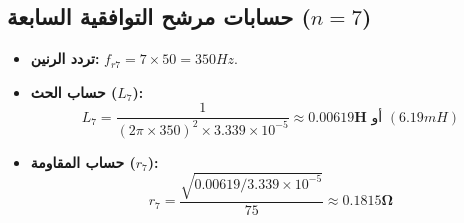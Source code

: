 
\subsection{حسابات مرشح التوافقية السابعة ($n=7$)}
\begin{itemize}
    \item \textbf{تردد الرنين:} $f_{r7} = 7 \times 50 = 350 Hz$.
    \item \textbf{حساب الحث ($L_7$):}
    \begin{equation*}
        L_7 = \frac{1}{(2 \pi \times 350)^2 \times 3.339 \times 10^{-5}} \approx \mathbf{0.00619 H} \text{ أو } (6.19 mH)
    \end{equation*}
    \item \textbf{حساب المقاومة ($r_7$):}
    \begin{equation*}
        r_7 = \frac{\sqrt{0.00619 / 3.339 \times 10^{-5}}}{75} \approx \mathbf{0.1815 \Omega}
    \end{equation*}
\end{itemize}
